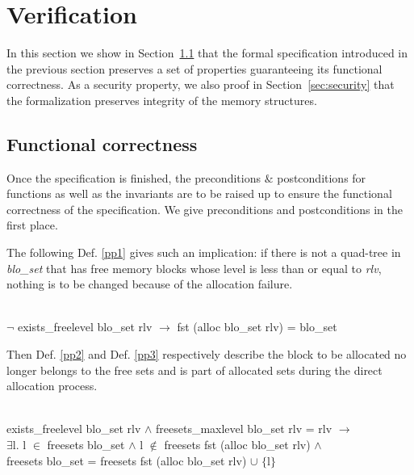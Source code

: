 \section{Verification}
In this section we show in Section~\ref{sec: functional} that the formal specification introduced in the previous section preserves a set of properties guaranteeing its functional correctness. As a security property, we also proof in Section~\ref{sec:security} that the formalization preserves integrity of the memory structures.
\subsection{Functional correctness}\label{sec: functional}
Once the specification is finished, the preconditions $\&$ postconditions for functions as well as the invariants are to be raised up to ensure the functional correctness of the specification. We give preconditions and postconditions in the first place.

The following Def. \ref{pp1} gives such an implication: if there is not a quad-tree in \emph{blo\_set} that has free memory blocks whose level is less than or equal to \emph{rlv}, nothing is to be changed because of the allocation failure.

\begin{definition}  \\
	$\neg$ exists\_freelevel blo\_set rlv $\longrightarrow$ fst (alloc blo\_set rlv) = blo\_set
	\label{pp1}
\end{definition}

Then Def. \ref{pp2} and Def. \ref{pp3} respectively describe the block to be allocated no longer belongs to the free sets and is part of allocated sets during the direct allocation process.

\begin{definition}  \\
	exists\_freelevel blo\_set rlv $\wedge$ freesets\_maxlevel blo\_set rlv = rlv $\longrightarrow$ \\
	\phantom{x} \hspace{10pt} $\exists$l. l $\in$ freesets blo\_set $\wedge$ l $\notin$ freesets fst (alloc blo\_set rlv) $\wedge$ \\
	\phantom{x} \hspace{10pt} freesets blo\_set = freesets fst (alloc blo\_set rlv) $\cup$ $\lbrace$l$\rbrace$
	\label{pp2}
\end{definition}


